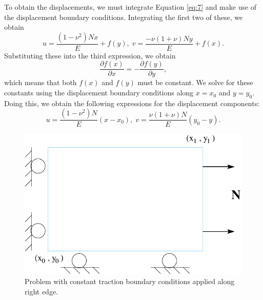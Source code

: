 To obtain the displacements, we must integrate Equation \vref{eq:7}
and make use of the displacement boundary conditions. Integrating
the first two of these, we obtain
\begin{equation}
u=\frac{\left(1-\nu^{2}\right)Nx}{E}+f\left(y\right),\; v=\frac{-\nu\left(1+\nu\right)Ny}{E}+f\left(x\right).\label{eq:8}
\end{equation}
Substituting these into the third expression, we obtain
\begin{equation}
\frac{\partial f\left(x\right)}{\partial x}=-\frac{\partial f\left(y\right)}{\partial y},\label{eq:9}
\end{equation}
which means that both $f\left(x\right)$ and $f\left(y\right)$ must
be constant. We solve for these constants using the displacement boundary
conditions along $x=x_{0}$ and $y=y_{0}$. Doing this, we obtain
the following expressions for the displacement components:
\begin{equation}
u=\frac{\left(1-\nu^{2}\right)N}{E}\left(x-x_{0}\right),\; v=\frac{\nu\left(1+\nu\right)N}{E}\left(y_{0}-y\right).\label{eq:10}
\end{equation}


\noindent \begin{center}
\begin{figure}[H]


\caption{\label{fig:Const-tractions}Problem with constant traction boundary
conditions applied along right edge.}


\noindent \centering{}\includegraphics{analyticalsolns/figs/consttract}
\end{figure}

\par\end{center}
